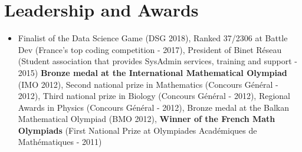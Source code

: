\documentclass[letterpaper,10pt]{article}
\newcommand{\resumeSubHeadingListStart}{\begin{itemize}[leftmargin=*]}
\newcommand{\resumeSubHeadingListEnd}{\end{itemize}}
\newcommand{\shorterSection}[1]{\vspace{-10pt}\section{#1}}
\begin{document}
\shorterSection{Leadership and Awards}
  \resumeSubHeadingListStart
    \item[]\small{
        {Finalist of the Data Science Game (DSG 2018), Ranked 37/2306 at Battle Dev (France's top coding competition - 2017), President of Binet Réseau (Student association that provides SysAdmin services, training and support - 2015) \textbf{Bronze medal at the International Mathematical Olympiad} (IMO 2012), Second national prize in Mathematics (Concours Général - 2012),  Third national prize in Biology (Concours Général - 2012),  Regional Awards in Physics (Concours Général - 2012), Bronze medal at the Balkan Mathematical Olympiad (BMO 2012), \textbf{Winner of the French Math Olympiads} (First National Prize at Olympiades Académiques de Mathématiques - 2011)  \vspace{-6pt}}
    }
  \resumeSubHeadingListEnd
\end{document}
